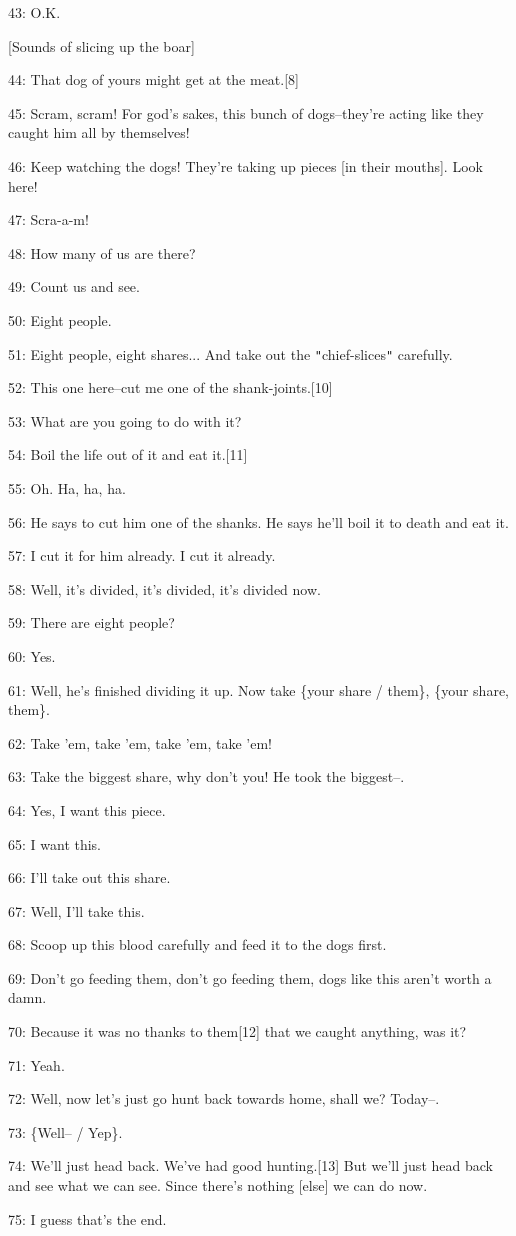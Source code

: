 43: O.K.

[Sounds of slicing up the boar]

44: That dog of yours might get at the meat.[8]

45: Scram, scram! For god's sakes, this bunch of dogs--they're acting like they
caught him all by themselves!

46: Keep watching the dogs! They're taking up pieces [in their mouths]. Look here!

47: Scra-a-m!

48: How many of us are there?

49: Count us and see.

50: Eight people.

51: Eight people, eight shares... And take out the \texttt{"}chief-slices\texttt{"}
carefully.

52: This one here--cut me one of the shank-joints.[10]

53: What are you going to do with it?

54: Boil the life out of it and eat it.[11]

55: Oh. Ha, ha, ha.

56: He says to cut him one of the shanks. He says he'll boil it to death and eat
it.

57: I cut it for him already. I cut it already.

58: Well, it's divided, it's divided, it's divided now.

59: There are eight people?

60: Yes.

61: Well, he's finished dividing it up. Now take \{your share / them\}, \{your
share, them\}.

62: Take 'em, take 'em, take 'em, take 'em!

63: Take the biggest share, why don't you! He took the biggest--.

64: Yes, I want this piece.

65: I want this.

66: I'll take out this share.

67: Well, I'll take this.

68: Scoop up this blood carefully and feed it to the dogs first.

69: Don't go feeding them, don't go feeding them, dogs like this aren't worth a
damn.

70: Because it was no thanks to them[12] that we caught anything, was it?

71: Yeah.

72: Well, now let's just go hunt back towards home, shall we? Today--.

73: \{Well-- / Yep\}.

74: We'll just head back. We've had good hunting.[13] But we'll just head back
and see what we can see. Since there's nothing [else] we can do now.

75: I guess that's the end.

